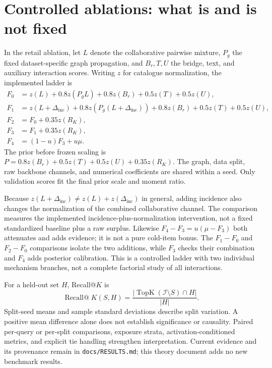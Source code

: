 \documentclass[11pt,a4paper]{article}
\theoremstyle{remark}
\newcommand{\inc}{\Delta_{\mathrm{inc}}}
\newcommand{\calI}{\mathcal{I}}
\newcommand{\code}[1]{\texttt{\small #1}}
\begin{document}
\section{Controlled ablations: what is and is not fixed}
In the retail ablation, let $L$ denote the collaborative pairwise mixture,
$P_g$ the fixed dataset-specific graph propagation, and $B_r,T,U$ the
bridge, text, and auxiliary interaction scores. Writing $z$ for catalogue
normalization, the implemented ladder is
\begin{align}
 F_0&=z(L)+0.8z(P_gL)+0.8z(B_r)+0.5z(T)+0.5z(U),\\
 F_1&=z(L+\inc)+0.8z(P_g(L+\inc))
                 +0.8z(B_r)+0.5z(T)+0.5z(U),\\
 F_2&=F_0+0.35z(R_K),\\
 F_3&=F_1+0.35z(R_K),\\
 F_4&=(1-u)F_3+u\mu.
 \label{eq:ablations}
\end{align}
The prior before frozen scaling is
$P=0.8z(B_r)+0.5z(T)+0.5z(U)+0.35z(R_K)$.
The graph, data split, raw backbone channels, and numerical coefficients
are shared within a seed. Only validation scores fit the final prior
scale and moment ratio.

Because $z(L+\inc)\neq z(L)+z(\inc)$ in general, adding incidence also
changes the normalization of the combined collaborative channel. The
comparison measures the implemented incidence-plus-normalization
intervention, not a fixed standardized baseline plus a raw surplus.
Likewise $F_4-F_3=u(\mu-F_3)$ both attenuates and adds evidence; it is not
a pure cold-item bonus. The $F_1-F_0$ and $F_2-F_0$ comparisons isolate
the two additions, while $F_3$ checks their combination and $F_4$ adds
posterior calibration. This is a controlled ladder with two individual
mechanism branches, not a complete factorial study of all interactions.

For a held-out set $H$, Recall@$K$ is
\begin{equation}
 \operatorname{Recall@}K(S,H)
 =\frac{|\operatorname{TopK}(\calI\setminus S)\cap H|}{|H|}.
\end{equation}
Split-seed means and sample standard deviations describe split variation.
A positive mean difference alone does not establish significance or
causality. Paired per-query or per-split comparisons, exposure strata,
activation-conditioned metrics, and explicit tie handling strengthen
interpretation. Current evidence and its provenance remain in
\code{docs/RESULTS.md}; this theory document adds no new benchmark results.
\end{document}
